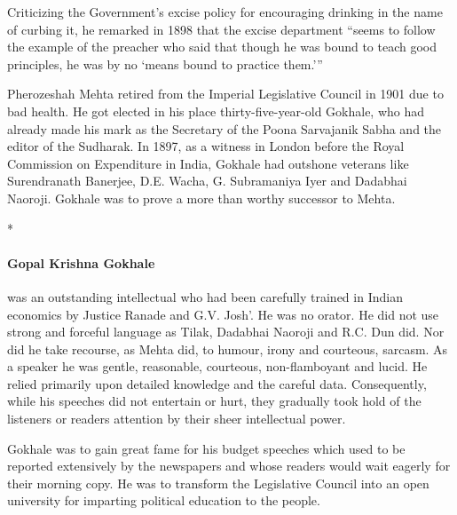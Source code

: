 Criticizing the Government's excise policy for encouraging drinking in the name of curbing it, he remarked in 1898 that the excise department ``seems to follow the example of the preacher who said that though he was bound to teach good principles, he was by no `means bound to practice them.'''

Pherozeshah Mehta retired from the Imperial Legislative Council in 1901 due to bad health. He got elected in his place thirty-five-year-old Gokhale, who had already made his mark as the Secretary of the Poona Sarvajanik Sabha and the editor of the Sudharak. In 1897, as a witness in London before the Royal Commission on Expenditure in India, Gokhale had outshone veterans like Surendranath Banerjee, D.E. Wacha, G. Subramaniya Iyer and Dadabhai Naoroji. Gokhale was to prove a more than worthy successor to Mehta.

\begin{center}*\end{center}

\paragraph{Gopal Krishna Gokhale}

 was an outstanding intellectual who had been carefully trained in Indian economics by Justice Ranade and G.V. Josh'. He was no orator. He did not use strong and forceful language as Tilak, Dadabhai Naoroji and R.C. Dun did. Nor did he take recourse, as Mehta did, to humour, irony and courteous, sarcasm. As a speaker he was gentle, reasonable, courteous, non-flamboyant and lucid. He relied primarily upon detailed knowledge and the careful data. Consequently, while his speeches did not entertain or hurt, they gradually took hold of the listeners or readers attention by their sheer intellectual power.

Gokhale was to gain great fame for his budget speeches which used to be reported extensively by the newspapers and whose readers would wait eagerly for their morning copy. He was to transform the Legislative Council into an open university for imparting political education to the people.

